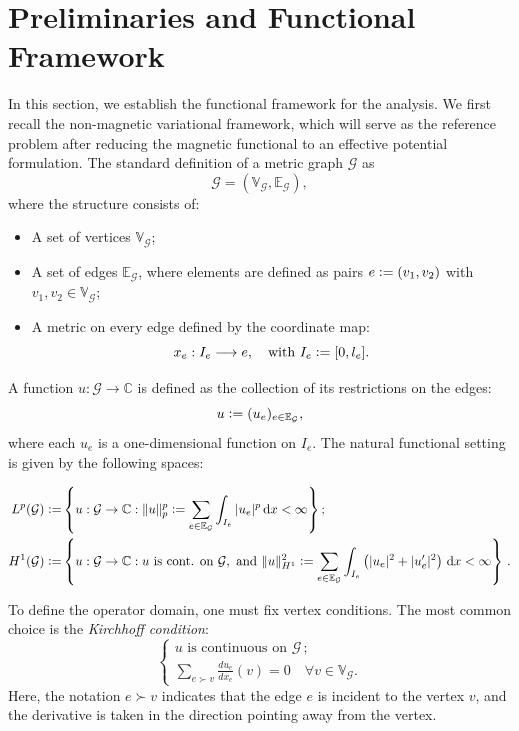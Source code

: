 \documentclass[12pt,a4paper]{amsart}
\theoremstyle{definition}
\theoremstyle{plain}
\newcommand{\defeq}{\vcentcolon=}
\numberwithin{equation}{section}
\begin{document}
\section{Preliminaries and Functional Framework}
\label{Sec3}
In this section, we establish the functional framework for the analysis. We first recall the non-magnetic variational framework, which will serve as the reference problem after reducing the magnetic functional to an effective potential formulation. The standard definition of a metric graph $\mathcal{G}$ as
\[
\mathcal{G}=(\mathbb{V}_\mathcal{G},\mathbb{E}_\mathcal{G}) ,
\]
where the structure consists of:
\begin{itemize}
    \item[(i)] A set of vertices $\mathbb{V}_\mathcal{G}$;
    \item[(ii)] A set of edges $\mathbb{E}_\mathcal{G}$, where elements are defined as pairs $e \defeq (v_1,v_2)$ with $v_1,v_2\in\mathbb{V}_\mathcal{G}$;
    \item[(iii)] A metric on every edge defined by the coordinate map:
    \[
    x_e: I_e \longrightarrow e, \quad \text{with } I_e \defeq [0,l_e].
    \]
\end{itemize}
A function $u:\mathcal{G}\to\mathbb{C}$ is defined as the collection of its restrictions on the edges:
\[
u \defeq (u_e)_{e\in\mathbb{E}_\mathcal{G}},
\]
where each $u_e$ is a one-dimensional function on $I_e$. The natural functional setting is given by the following spaces:

\begin{align*}
    L^p(\mathcal{G}) \defeq & \left\lbrace u:\mathcal{G}\to\mathbb{C} : \|u\|_p^p \defeq \sum_{e\in\mathbb{E}_\mathcal{G}}\int_{I_e}|u_e|^p\, \mathrm{d} x<\infty \right\rbrace;\\
      H^1(\mathcal{G}) \defeq & \left\lbrace u:\mathcal{G}\to\mathbb{C} : u \text{ is cont. on } \mathcal{G}, \text{ and }  \|u\|^2_{H^1} \defeq \sum_{e\in\mathbb{E}_\mathcal{G}}\int_{I_e} \left( |u_e|^2+|u'_e|^2 \right) \,\mathrm{d} x<\infty \right\rbrace\,.
\end{align*}

To define the operator domain, one must fix vertex conditions. The most common choice is the \emph{Kirchhoff condition}:
\begin{equation}
    \begin{cases}
        u \text{ is continuous on } \mathcal{G}\,;\\
        \sum_{e\succ v}\frac{d u_e}{d x_e}(v)=0 \quad \forall v\in\mathbb{V}_\mathcal{G}.
    \end{cases}
    \label{kirchhoff}
\end{equation}
Here, the notation $e\succ v$ indicates that the edge $e$ is incident to the vertex $v$, and the derivative is taken in the direction pointing away from the vertex. 
\end{document}
